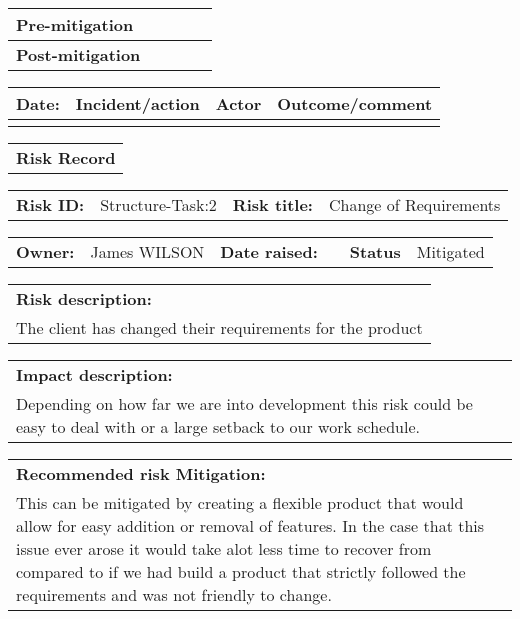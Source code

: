 \begin{table}
\begin{tabularx}{\textwidth}{| l | l | X | X | X |}
		\textbf{Pre-mitigation} & & & & \\ \hline
		\textbf{Post-mitigation} & & & & \\ \hline \hline
	\end{tabularx}
	\begin{tabularx}{\textwidth}{| l | X | l | X |}
		\hline
		\textbf{Date:} & \textbf{Incident/action} & \textbf{Actor} & \textbf{Outcome/comment} \\ \hline
		 & &  &  \\ \hline
	\end{tabularx}%
\end{table}

\begin{table}
	\begin{tabularx}{\textwidth}{| X |}
		\hline
		\textbf{Risk Record} \\
	\end{tabularx}
	\begin{tabularx}{\textwidth}{| l | X | l | X |}
		\hline
		\textbf{Risk ID:} & Structure-Task:2 & \textbf{Risk title:} & Change of Requirements \\
	\end{tabularx}
	\begin{tabularx}{\textwidth}{| l | X | l | X | l | X |}
		\hline
		\textbf{Owner:} & James WILSON & \textbf{Date raised:} &  & \textbf{Status} & Mitigated \\
	\end{tabularx}
	\begin{tabularx}{\textwidth}{| X |}
		\hline
		\textbf{Risk description:} \\ The client has changed their requirements for the product \\
	\end{tabularx}
	\begin{tabularx}{\textwidth}{| X |}
		\hline
		\textbf{Impact description:} \\ Depending on how far we are into development this risk could be easy to deal with or a large setback to our work schedule. \\
	\end{tabularx}
	\begin{tabularx}{\textwidth}{| X |}
		\hline
		\textbf{Recommended risk Mitigation:} \\ This can be mitigated by creating a flexible product that would allow for easy addition or removal of features. In the case that this issue ever arose it would take alot less time to recover from compared to if we had build a product that strictly followed the requirements and was not friendly to change. \\

\end{tabularx}
\end{table}
